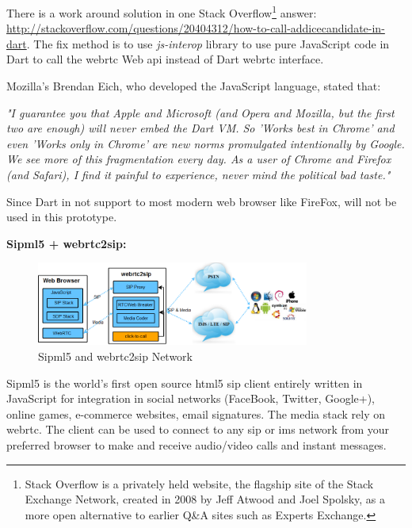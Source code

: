 \par There is a work around solution in one Stack Overflow\footnote{Stack Overflow is a privately held website, the flagship site of the Stack Exchange Network, created in 2008 by Jeff Atwood and Joel Spolsky, as a more open alternative to earlier Q\&A sites such as Experts Exchange.} answer: \url{http://stackoverflow.com/questions/20404312/how-to-call-addicecandidate-in-dart}. The fix method is to use \textit{js-interop} library to use pure JavaScript code in Dart to call the \gls{webrtc} Web \gls{api} instead of Dart \gls{webrtc} interface.
\par Mozilla's Brendan Eich, who developed the JavaScript language, stated that:

\textit{"I guarantee you that Apple and Microsoft (and Opera and Mozilla, but the first two are enough) will never embed the Dart VM. So 'Works best in Chrome' and even 'Works only in Chrome' are new norms promulgated intentionally by Google. We see more of this fragmentation every day. As a user of Chrome and Firefox (and Safari), I find it painful to experience, never mind the political bad taste."}\cite{wiki:dart}

\par Since Dart in not support to most modern web browser like FireFox, will not be used in this prototype.

\textbf{Sipml5 + webrtc2sip:}

\begin{figure}
	\centering
    	\includegraphics[width=0.80\textwidth,natwidth=610,natheight=642]{figs/sipml5_network.png}
  	\caption{Sipml5 and webrtc2sip Network}
  	\label{fig:sipml5_network}
\end{figure}

\par Sipml5 is the world's first open source \gls{html5} \gls{sip} client entirely written in JavaScript for integration in social networks (FaceBook, Twitter, Google+), online games, e-commerce websites, email signatures. The media stack rely on \gls{webrtc}. The client can be used to connect to any \gls{sip} or \gls{ims} network from your preferred browser to make and receive audio/video calls and instant messages.\cite{website:sipml5}

